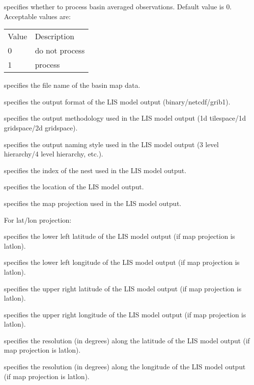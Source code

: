   specifies whether to
 process basin averaged observations.  Default value is 0.
 Acceptable values are:

 \begin{tabular}{ll}
 Value & Description    \\
 0     & do not process \\
 1     & process        \\
 \end{tabular}

  specifies the file name of the
 basin map data.

 specifies the output format of the LIS model output
 (binary/netcdf/grib1).

 specifies the output methodology used in the LIS model output
 (1d tilespace/1d gridspace/2d gridspace).

 specifies the output naming style used in the LIS model output 
 (3 level hierarchy/4 level hierarchy, etc.).

 specifies the index of the nest used in the LIS model output.

 specifies the location of the LIS model output.

 specifies the map projection used in the LIS model output.

 For lat/lon projection:

 specifies the lower left latitude of the LIS model output
 (if map projection is latlon).

 specifies the lower left longitude of the LIS model output
 (if map projection is latlon).

 specifies the upper right latitude of the LIS model output
 (if map projection is latlon).

 specifies the upper right longitude of the LIS model output
 (if map projection is latlon).

 specifies the resolution (in degrees) along the latitude of the
 LIS model output (if map projection is latlon).

 specifies the resolution (in degrees) along the longitude of the
 LIS model output (if map projection is latlon).

